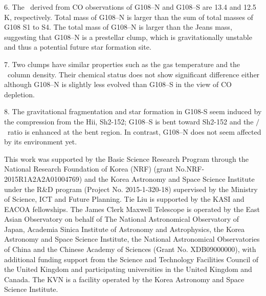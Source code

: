 \documentclass[manuscript]{aastex}
\begin{document}
6. The \tex\ derived from CO observations of G108--N and G108--S are 13.4 and 12.5 K, respectively.
Total mass of G108--N is larger than the sum of total masses of G108 S1 to S4.
The total mass of G108--N is larger than the Jeans mass, suggesting that G108--N is a prestellar clump, which is gravitationally unstable and thus a potential future star formation site.

7. Two clumps have similar properties such as the gas temperature and the \atomh\ column density.
Their chemical status does not show significant difference either although G108--N is slightly less evolved than G108--S in the view of CO depletion.

8. The gravitational fragmentation and star formation in G108-S seem induced by the compression from the H{\sc ii}, Sh2-152; G108--S is bent toward Sh2-152 and the \tcot$/$\tco\ ratio is enhanced at the bent region.  
In contrast, G108--N does not seem affected by its environment yet.


This work was supported by the Basic Science Research Program through the National Research Foundation of Korea (NRF) (grant No.NRF-2015R1A2A2A01004769) and the Korea Astronomy and Space Science Institute under the R\&D program (Project No. 2015-1-320-18) supervised by the Ministry of Science, ICT and Future Planning.
Tie Liu is supported by the KASI and EACOA fellowships. The James Clerk Maxwell Telescope is operated by the East Asian Observatory on behalf of The National Astronomical Observatory of Japan, Academia Sinica Institute of Astronomy and Astrophysics, the Korea Astronomy and Space Science Institute, the National Astronomical Observatories of China and the Chinese Academy of Sciences (Grant No. XDB09000000), with additional funding support from the Science and Technology Facilities Council of the United Kingdom and participating universities in the United Kingdom and Canada.
The KVN is a facility operated by the Korea Astronomy and Space Science Institute.
\end{document}
